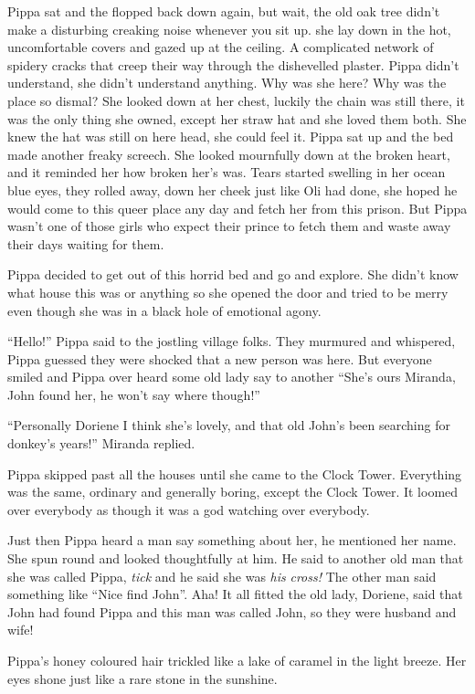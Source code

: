 Pippa sat and the flopped back down again, but wait, the old oak tree
didn't make a disturbing creaking noise whenever you sit up. she lay
down in the hot, uncomfortable covers and gazed up at the ceiling. A
complicated network of spidery cracks that creep their way through the
dishevelled plaster. Pippa didn't understand, she didn't understand
anything. Why was she here? Why was the place so dismal? She looked down
at her chest, luckily the chain was still there, it was the only thing
she owned, except her straw hat and she loved them both. She knew the
hat was still on here head, she could feel it. Pippa sat up and the bed
made another freaky screech. She looked mournfully down at the broken
heart, and it reminded her how broken her's was. Tears started swelling
in her ocean blue eyes, they rolled away, down her cheek just like Oli
had done, she hoped he would come to this queer place any day and fetch
her from this prison. But Pippa wasn't one of those girls who expect
their prince to fetch them and waste away their days waiting for them.

Pippa decided to get out of this horrid bed and go and explore. She
didn't know what house this was or anything so she opened the door and
tried to be merry even though she was in a black hole of emotional
agony.

``Hello!'' Pippa said to the jostling village folks. They murmured and
whispered, Pippa guessed they were shocked that a new person was here.
But everyone smiled and Pippa over heard some old lady say to another
``She's ours Miranda, John found her, he won't say where though!''

``Personally Doriene I think she's lovely, and that old John's been
searching for donkey's years!'' Miranda replied.

Pippa skipped past all the houses until she came to the Clock Tower.
Everything was the same, ordinary and generally boring, except the Clock
Tower. It loomed over everybody as though it was a god watching over
everybody.

Just then Pippa heard a man say something about her, he mentioned her
name. She spun round and looked thoughtfully at him. He said to another
old man that she was called Pippa, \emph{tick} and he said she was
\emph{his} \emph{cross!} The other man said something like ``Nice find
John''. Aha! It all fitted the old lady, Doriene, said that John had
found Pippa and this man was called John, so they were husband and wife!

Pippa's honey coloured hair trickled like a lake of caramel in the light
breeze. Her eyes shone just like a rare stone in the sunshine.

